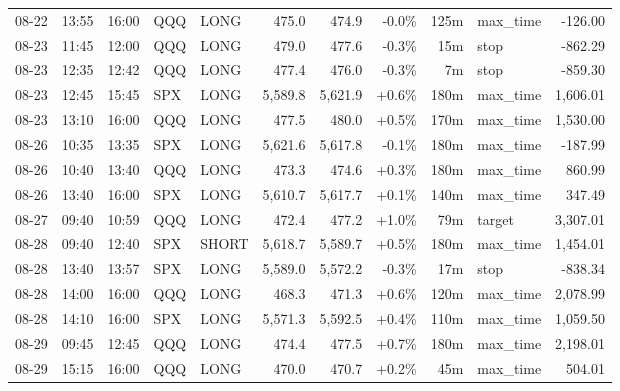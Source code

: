 \documentclass[11pt,a4paper,twoside]{article}
\begin{document}
\begin{center}
\begin{longtable}{>{\color{txtmain}}l l l l l r r r r >{\color{txtmain}}l r}
08-22 & 13:55 & 16:00 & QQQ & LONG & 475.0 & 474.9 & \textcolor{lossred}{-0.0\%} & 125m & max\_time & \textcolor{lossred}{-126.00} \\
08-23 & 11:45 & 12:00 & QQQ & LONG & 479.0 & 477.6 & \textcolor{lossred}{-0.3\%} & 15m & stop & \textcolor{lossred}{-862.29} \\
08-23 & 12:35 & 12:42 & QQQ & LONG & 477.4 & 476.0 & \textcolor{lossred}{-0.3\%} & 7m & stop & \textcolor{lossred}{-859.30} \\
08-23 & 12:45 & 15:45 & SPX & LONG & 5,589.8 & 5,621.9 & \textcolor{wingreen}{+0.6\%} & 180m & max\_time & \textcolor{wingreen}{1,606.01} \\
08-23 & 13:10 & 16:00 & QQQ & LONG & 477.5 & 480.0 & \textcolor{wingreen}{+0.5\%} & 170m & max\_time & \textcolor{wingreen}{1,530.00} \\
08-26 & 10:35 & 13:35 & SPX & LONG & 5,621.6 & 5,617.8 & \textcolor{lossred}{-0.1\%} & 180m & max\_time & \textcolor{lossred}{-187.99} \\
08-26 & 10:40 & 13:40 & QQQ & LONG & 473.3 & 474.6 & \textcolor{wingreen}{+0.3\%} & 180m & max\_time & \textcolor{wingreen}{860.99} \\
08-26 & 13:40 & 16:00 & SPX & LONG & 5,610.7 & 5,617.7 & \textcolor{wingreen}{+0.1\%} & 140m & max\_time & \textcolor{wingreen}{347.49} \\
08-27 & 09:40 & 10:59 & QQQ & LONG & 472.4 & 477.2 & \textcolor{wingreen}{+1.0\%} & 79m & target & \textcolor{wingreen}{3,307.01} \\
08-28 & 09:40 & 12:40 & SPX & SHORT & 5,618.7 & 5,589.7 & \textcolor{wingreen}{+0.5\%} & 180m & max\_time & \textcolor{wingreen}{1,454.01} \\
08-28 & 13:40 & 13:57 & SPX & LONG & 5,589.0 & 5,572.2 & \textcolor{lossred}{-0.3\%} & 17m & stop & \textcolor{lossred}{-838.34} \\
08-28 & 14:00 & 16:00 & QQQ & LONG & 468.3 & 471.3 & \textcolor{wingreen}{+0.6\%} & 120m & max\_time & \textcolor{wingreen}{2,078.99} \\
08-28 & 14:10 & 16:00 & SPX & LONG & 5,571.3 & 5,592.5 & \textcolor{wingreen}{+0.4\%} & 110m & max\_time & \textcolor{wingreen}{1,059.50} \\
08-29 & 09:45 & 12:45 & QQQ & LONG & 474.4 & 477.5 & \textcolor{wingreen}{+0.7\%} & 180m & max\_time & \textcolor{wingreen}{2,198.01} \\
08-29 & 15:15 & 16:00 & QQQ & LONG & 470.0 & 470.7 & \textcolor{wingreen}{+0.2\%} & 45m & max\_time & \textcolor{wingreen}{504.01} \\

\end{longtable}
\end{center}
\end{document}
